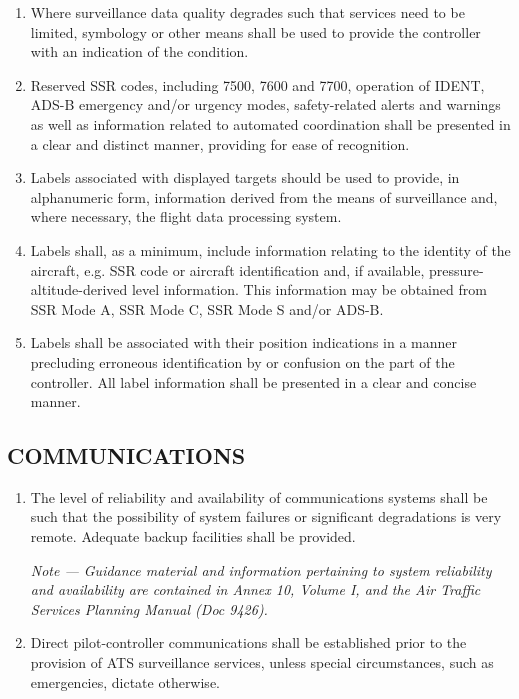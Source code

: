 \documentclass[../main.tex]{subfiles}
\begin{document}
\begin{enumerate}[label=\arabic{section}.\arabic{subsection}.\arabic*]
        \item Where surveillance data quality degrades such that services need to be limited, symbology or other means shall be used to provide the controller with an indication of the condition.
        \item Reserved SSR codes, including 7500, 7600 and 7700, operation of IDENT, ADS-B emergency and/or urgency modes, safety-related alerts and warnings as well as information related to automated coordination shall be presented in a clear and distinct manner, providing for ease of recognition.
        \item Labels associated with displayed targets should be used to provide, in alphanumeric form, information derived from the means of surveillance and, where necessary, the flight data processing system.
        \item Labels shall, as a minimum, include information relating to the identity of the aircraft, e.g. SSR code or aircraft identification and, if available, pressure-altitude-derived level information. This information may be obtained from SSR Mode A, SSR Mode C, SSR Mode S and/or ADS-B.
        \item Labels shall be associated with their position indications in a manner precluding erroneous identification by or confusion on the part of the controller. All label information shall be presented in a clear and concise manner.
    \end{enumerate}

    \subsection[Communications]{COMMUNICATIONS}

    \begin{enumerate}[label=\arabic{section}.\arabic{subsection}.\arabic*]
        \item The level of reliability and availability of communications systems shall be such that the possibility of system failures or significant degradations is very remote. Adequate backup facilities shall be provided.

        \textit{Note --- Guidance material and information pertaining to system reliability and availability are contained in Annex 10, Volume I, and the \emph{Air Traffic Services Planning Manual} (Doc 9426).}

        \item Direct pilot-controller communications shall be established prior to the provision of ATS surveillance services, unless special circumstances, such as emergencies, dictate otherwise.
    \end{enumerate}
\end{document}
